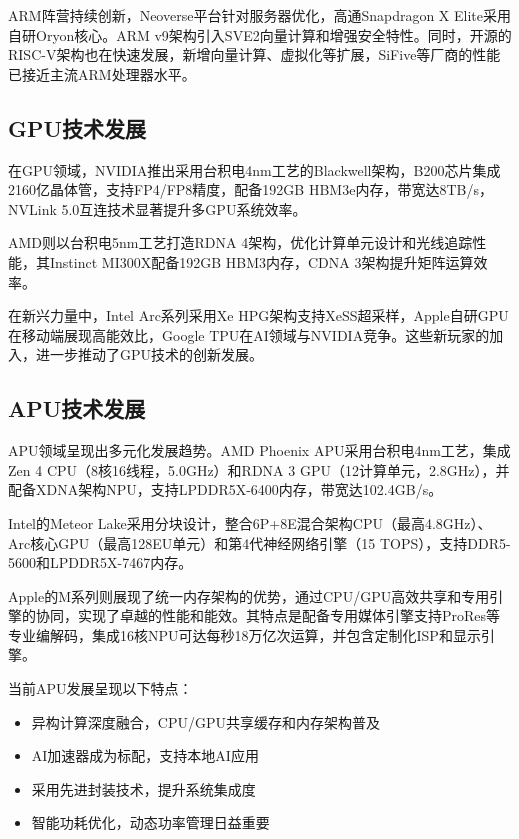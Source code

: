 \documentclass[a4paper,colorlinks=true,linkcolor=blue,urlcolor=blue,citecolor=green,bookmarks=true]{article}
\begin{document}
ARM阵营持续创新，Neoverse平台针对服务器优化，高通Snapdragon X Elite采用自研Oryon核心\cite{14}\cite{15}。ARM v9架构引入SVE2向量计算和增强安全特性\cite{14}。同时，开源的RISC-V架构也在快速发展，新增向量计算、虚拟化等扩展\cite{19}，SiFive等厂商的性能已接近主流ARM处理器水平\cite{14}\cite{19}。

\subsection{GPU技术发展}

在GPU领域，NVIDIA推出采用台积电4nm工艺的Blackwell架构，B200芯片集成2160亿晶体管，支持FP4/FP8精度，配备192GB HBM3e内存，带宽达8TB/s，NVLink 5.0互连技术显著提升多GPU系统效率\cite{14}\cite{15}。

AMD则以台积电5nm工艺打造RDNA 4架构，优化计算单元设计和光线追踪性能，其Instinct MI300X配备192GB HBM3内存，CDNA 3架构提升矩阵运算效率\cite{14}\cite{15}。

在新兴力量中，Intel Arc系列采用Xe HPG架构支持XeSS超采样，Apple自研GPU在移动端展现高能效比，Google TPU在AI领域与NVIDIA竞争\cite{14}\cite{15}。这些新玩家的加入，进一步推动了GPU技术的创新发展。

\subsection{APU技术发展}

APU领域呈现出多元化发展趋势。AMD Phoenix APU采用台积电4nm工艺，集成Zen 4 CPU（8核16线程，5.0GHz）和RDNA 3 GPU（12计算单元，2.8GHz），并配备XDNA架构NPU，支持LPDDR5X-6400内存，带宽达102.4GB/s\cite{14}\cite{15}。

Intel的Meteor Lake采用分块设计，整合6P+8E混合架构CPU（最高4.8GHz）、Arc核心GPU（最高128EU单元）和第4代神经网络引擎（15 TOPS），支持DDR5-5600和LPDDR5X-7467内存\cite{14}\cite{15}。

Apple的M系列则展现了统一内存架构的优势，通过CPU/GPU高效共享和专用引擎的协同，实现了卓越的性能和能效。其特点是配备专用媒体引擎支持ProRes等专业编解码，集成16核NPU可达每秒18万亿次运算，并包含定制化ISP和显示引擎\cite{14}\cite{15}。

当前APU发展呈现以下特点：
\begin{itemize}
\item 异构计算深度融合，CPU/GPU共享缓存和内存架构普及
\item AI加速器成为标配，支持本地AI应用
\item 采用先进封装技术，提升系统集成度
\item 智能功耗优化，动态功率管理日益重要
\end{itemize}
\end{document}
